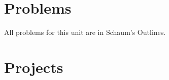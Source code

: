 

\section{Problems}






All problems for this unit are in Schaum's Outlines.



%
%
%
%

























\section{Projects}


